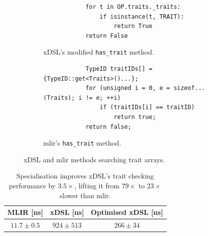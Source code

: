 \begin{figure}[H]
    \centering
    \begin{subfigure}[b]{0.45\textwidth}
       \centering
        \begin{verbatim}
            for t in OP.traits._traits:
                if isinstance(t, TRAIT):
                    return True
            return False
        \end{verbatim}
        \footnotesize\vspace{2em}
        \captionsetup{name=Listing}
        \caption{xDSL's modified \texttt{has_trait} method.}
        \label{listing:ubenchmark-trait-checks-both-xdsl}
    \end{subfigure}
    \hfill
    \begin{subfigure}[b]{0.45\textwidth}
        \centering
        \begin{verbatim}
            TypeID traitIDs[] = {TypeID::get<Traits>()...};
            for (unsigned i = 0, e = sizeof...(Traits); i != e; ++i)
                if (traitIDs[i] == traitID)
                    return true;
            return false;
        \end{verbatim}
        \captionsetup{name=Listing}
        \caption{\ac{mlir}'s \texttt{has_trait} method.}
        \label{listing:ubenchmark-trait-checks-both-mlir}
    \end{subfigure}
    \vspace{1em}
    \captionsetup{name=Listing}
    \caption{xDSL and \ac{mlir} methods searching trait arrays.}
    \label{listing:ubenchmark-trait-checks-both}
\end{figure}



\begin{table}[H]
  \caption{Specialisation improves xDSL's trait checking performance by $3.5\times$, lifting it from $79\times$ to $23\times$ slower than \ac{mlir}.}
  \label{tab:ubenchmark-trait-checks-optimised}
  \centering
  \begin{tabular}{ccc}
    \toprule
    \textbf{MLIR [ns]} & \textbf{xDSL [ns]} & \textbf{Optimised xDSL [ns]} \\
    \midrule
    $11.7 \pm 0.5$ & $924 \pm 513$ & $266 \pm 34$\\
    \bottomrule
  \end{tabular}
\end{table}


